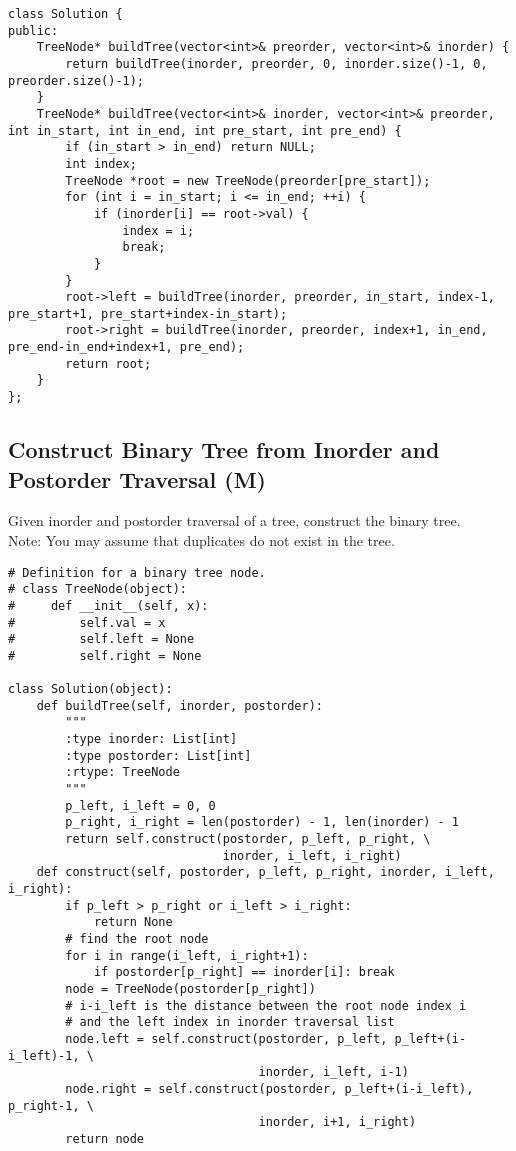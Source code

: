 \begin{lstlisting}
class Solution {
public:
    TreeNode* buildTree(vector<int>& preorder, vector<int>& inorder) {
        return buildTree(inorder, preorder, 0, inorder.size()-1, 0, preorder.size()-1);
    }
    TreeNode* buildTree(vector<int>& inorder, vector<int>& preorder, int in_start, int in_end, int pre_start, int pre_end) {
        if (in_start > in_end) return NULL;
        int index;
        TreeNode *root = new TreeNode(preorder[pre_start]);
        for (int i = in_start; i <= in_end; ++i) {
            if (inorder[i] == root->val) {
                index = i;
                break;
            }
        }
        root->left = buildTree(inorder, preorder, in_start, index-1, pre_start+1, pre_start+index-in_start);
        root->right = buildTree(inorder, preorder, index+1, in_end, pre_end-in_end+index+1, pre_end);
        return root;
    }
};
\end{lstlisting}


\subsection{Construct Binary Tree from Inorder and Postorder Traversal (M)}
Given inorder and postorder traversal of a tree, construct the binary tree. \\

Note: You may assume that duplicates do not exist in the tree. \\

\begin{lstlisting}
# Definition for a binary tree node.
# class TreeNode(object):
#     def __init__(self, x):
#         self.val = x
#         self.left = None
#         self.right = None

class Solution(object):
    def buildTree(self, inorder, postorder):
        """
        :type inorder: List[int]
        :type postorder: List[int]
        :rtype: TreeNode
        """
        p_left, i_left = 0, 0
        p_right, i_right = len(postorder) - 1, len(inorder) - 1
        return self.construct(postorder, p_left, p_right, \
                              inorder, i_left, i_right)
    def construct(self, postorder, p_left, p_right, inorder, i_left, i_right):
        if p_left > p_right or i_left > i_right:
            return None
        # find the root node
        for i in range(i_left, i_right+1):
            if postorder[p_right] == inorder[i]: break
        node = TreeNode(postorder[p_right])
        # i-i_left is the distance between the root node index i 
        # and the left index in inorder traversal list
        node.left = self.construct(postorder, p_left, p_left+(i-i_left)-1, \
                                   inorder, i_left, i-1)
        node.right = self.construct(postorder, p_left+(i-i_left), p_right-1, \
                                   inorder, i+1, i_right)
        return node
\end{lstlisting}

